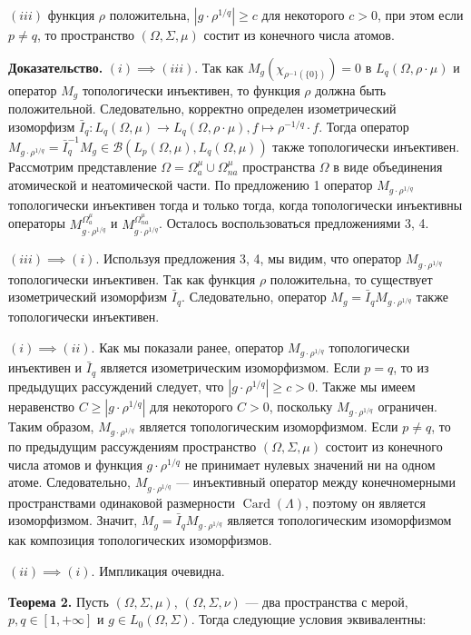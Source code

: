 \documentclass[11pt,twoside]{article}
\begin{document}
$(iii)$ функция $\rho$ положительна, $|g\cdot \rho^{1/q}|\geq c$ для некоторого $c>0$, при этом если $p\neq q$, то пространство $(\Omega,\Sigma,\mu)$ состит из конечного числа атомов.

\textbf{Доказательство.} $(i)$$\implies$$ (iii)$. Так как $M_g(\chi_{\rho^{-1}(\{0\})})=0$ в $L_q(\Omega,\rho\cdot\mu)$ и оператор $M_g$ топологически инъективен, то функция $\rho$ должна быть положительной. Следовательно, корректно определен изометрический изоморфизм $\bar{I}_q:L_q(\Omega,\mu)\to L_q(\Omega,\rho\cdot\mu),f\mapsto \rho^{-1/q}\cdot f$. Тогда оператор $M_{g\cdot\rho^{1/q}}=\bar{I}_q^{-1} M_g\in\mathcal{B}(L_p(\Omega,\mu),L_q(\Omega,\mu))$ также топологически инъективен. Рассмотрим представление $\Omega=\Omega_a^{\mu}\cup\Omega_{na}^{\mu}$ пространства $\Omega$ в виде объединения атомической и неатомической части. По предложению  1 оператор $M_{g\cdot\rho^{1/q}}$ топологически инъективен тогда и только тогда, когда топологически инъективны операторы $M_{g\cdot\rho^{1/q}}^{\Omega_a^{\mu}}$ и $M_{g\cdot\rho^{1/q}}^{\Omega_{na}^{\mu}}$. Осталось воспользоваться предложениями 3, 4.

$(iii)$$\implies$$ (i)$. Используя предложения 3, 4, мы видим, что оператор $M_{g\cdot\rho^{1/q}}$ топологически инъективен. Так как функция $\rho$ положительна, то существует изометрический изоморфизм $\bar{I}_q$. Следовательно, оператор $M_g=\bar{I}_q M_{g\cdot\rho^{1/q}}$ также топологически инъективен.

$(i)$$\implies$$ (ii)$. Как мы показали ранее, оператор $M_{g\cdot\rho^{1/q}}$ топологически инъективен и $\bar{I}_q$ является изометрическим изоморфизмом. Если $p=q$, то из предыдущих рассуждений следует, что $|{g\cdot\rho^{1/q}}|\geq c>0$. Также мы имеем неравенство $C\geq |{g\cdot\rho^{1/q}}|$ для некоторого $C>0$, поскольку $M_{{g\cdot\rho^{1/q}}}$ ограничен. Таким образом, $M_{{g\cdot\rho^{1/q}}}$ является топологическим изоморфизмом. Если $p\neq q$, то по предыдущим рассуждениям пространство $(\Omega,\Sigma,\mu)$ состоит из конечного числа атомов и функция $g\cdot\rho^{1/q}$ не принимает нулевых значений ни на одном атоме. Следовательно, $M_{g\cdot\rho^{1/q}}$ --- инъективный оператор между конечномерными пространствами одинаковой размерности $\operatorname{Card}(\Lambda)$, поэтому он является изоморфизмом. Значит, $M_g=\bar{I}_q M_{g\cdot\rho^{1/q}}$ является топологическим изоморфизмом как композиция топологических изоморфизмов.

$(ii)$$\implies$$ (i)$. Импликация очевидна.


\textbf{Теорема 2.} Пусть $(\Omega,\Sigma,\mu)$, $(\Omega,\Sigma,\nu)$ --- два пространства с мерой, $p,q\in[1,+\infty]$ и $g\in L_0(\Omega,\Sigma)$. Тогда следующие условия эквивалентны:
\end{document}
